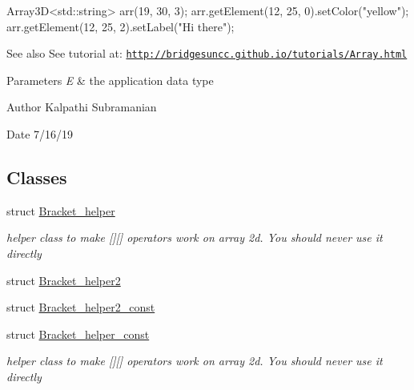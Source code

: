 \begin{DoxyCode}
Array3D<std::string> arr(19, 30, 3);
arr.getElement(12, 25, 0).setColor(\textcolor{stringliteral}{"yellow"});
arr.getElement(12, 25, 2).setLabel(\textcolor{stringliteral}{"Hi there"});
\end{DoxyCode}


\begin{DoxySeeAlso}{See also}
See tutorial at\+: \href{http://bridgesuncc.github.io/tutorials/Array.html}{\tt http\+://bridgesuncc.\+github.\+io/tutorials/\+Array.\+html}
\end{DoxySeeAlso}

\begin{DoxyParams}{Parameters}
{\em E} & the application data type\\
\hline
\end{DoxyParams}
\begin{DoxyAuthor}{Author}
Kalpathi Subramanian 
\end{DoxyAuthor}
\begin{DoxyDate}{Date}
7/16/19 
\end{DoxyDate}
\subsection*{Classes}
\begin{DoxyCompactItemize}
\item 
struct \hyperlink{structbridges_1_1datastructure_1_1_array3_d_1_1_bracket__helper}{Bracket\+\_\+helper}
\begin{DoxyCompactList}\small\item\em helper class to make \mbox{[}\mbox{]}\mbox{[}\mbox{]} operators work on array 2d. You should never use it directly \end{DoxyCompactList}\item 
struct \hyperlink{structbridges_1_1datastructure_1_1_array3_d_1_1_bracket__helper2}{Bracket\+\_\+helper2}
\item 
struct \hyperlink{structbridges_1_1datastructure_1_1_array3_d_1_1_bracket__helper2__const}{Bracket\+\_\+helper2\+\_\+const}
\item 
struct \hyperlink{structbridges_1_1datastructure_1_1_array3_d_1_1_bracket__helper__const}{Bracket\+\_\+helper\+\_\+const}
\begin{DoxyCompactList}\small\item\em helper class to make \mbox{[}\mbox{]}\mbox{[}\mbox{]} operators work on array 2d. You should never use it directly \end{DoxyCompactList}\end{DoxyCompactItemize}
